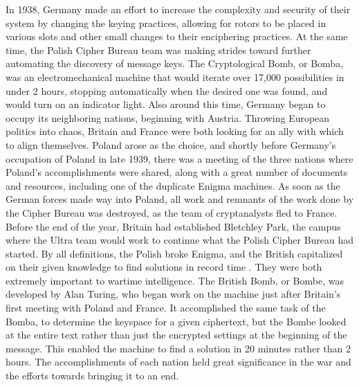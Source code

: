In 1938, Germany made an effort to increase the complexity and security of their system by changing the keying practices, allowing for rotors to be placed in various slots and other small changes to their enciphering practices. At the same time, the Polish Cipher Bureau team was making strides toward further automating the discovery of message keys. The Cryptological Bomb, or Bomba, was an electromechanical machine that would iterate over 17,000 possibilities in under 2 hours, stopping automatically when the desired one was found, and would turn on an indicator light. Also around this time, Germany began to occupy its neighboring nations, beginning with Austria. Throwing European politics into chaos, Britain and France were both looking for an ally with which to align themselves. Poland arose as the choice, and shortly before Germany’s occupation of Poland in late 1939, there was a meeting of the three nations where Poland’s accomplishments were shared, along with a great number of documents and resources, including one of the duplicate Enigma machines. As soon as the German forces made way into Poland, all work and remnants of the work done by the Cipher Bureau was destroyed, as the team of cryptanalysts fled to France. Before the end of the year, Britain had established Bletchley Park, the campus where the Ultra team would work to continue what the Polish Cipher Bureau had started. By all definitions, the Polish broke Enigma, and the British capitalized on their given knowledge to find solutions in record time \cite{rfc01}. They were both extremely important to wartime intelligence. The British Bomb, or Bombe, was developed by Alan Turing, who began work on the machine just after Britain’s first meeting with Poland and France. It accomplished the same task of the Bomba, to determine the keyspace for a given ciphertext, but the Bombe looked at the entire text rather than just the encrypted settings at the beginning of the message. This enabled the machine to find a solution in 20 minutes rather than 2 hours. The accomplishments of each nation held great significance in the war and the efforts towards bringing it to an end.
\begingroup
\renewcommand{\cleardoublepage}{}
\renewcommand{\clearpage}{}